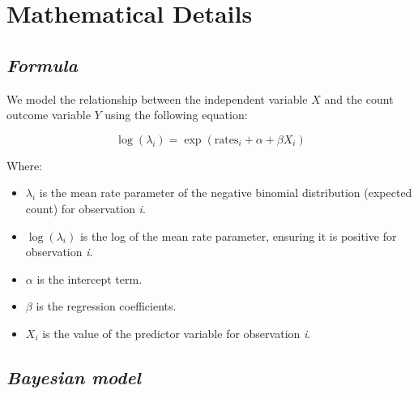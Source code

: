 \documentclass[
  letterpaper,
  DIV=11,
  numbers=noendperiod]{scrreprt}
\newenvironment{Shaded}{\begin{snugshade}}{\end{snugshade}}
\newcommand{\CommentTok}[1]{\textcolor[rgb]{0.37,0.37,0.37}{#1}}
\newcommand{\FloatTok}[1]{\textcolor[rgb]{0.68,0.00,0.00}{#1}}
\newcommand{\FunctionTok}[1]{\textcolor[rgb]{0.28,0.35,0.67}{#1}}
\newcommand{\NormalTok}[1]{\textcolor[rgb]{0.00,0.23,0.31}{#1}}
\newcommand{\SpecialCharTok}[1]{\textcolor[rgb]{0.37,0.37,0.37}{#1}}
\begin{document}
\begin{Shaded}
\end{Shaded}

\section{Mathematical Details}\label{mathematical-details-7}

\subsection{\texorpdfstring{\emph{Formula}}{Formula}}\label{formula-1}

We model the relationship between the independent variable \(X\) and the
count outcome variable \(Y\) using the following equation:

\[
\log(\lambda_i) = \exp(\text{rates}_i + \alpha + \beta X_i)
\]

Where:

\begin{itemize}
\item
  \(\lambda_i\) is the mean rate parameter of the negative binomial
  distribution (expected count) for observation \emph{i}.
\item
  \(\log(\lambda_i)\) is the log of the mean rate parameter, ensuring it
  is positive for observation \emph{i}.
\item
  \(\alpha\) is the intercept term.
\item
  \(\beta\) is the regression coefficients.
\item
  \(X_i\) is the value of the predictor variable for observation
  \emph{i}.
\end{itemize}

\subsection{\texorpdfstring{\emph{Bayesian
model}}{Bayesian model}}\label{bayesian-model-1}
\end{document}
